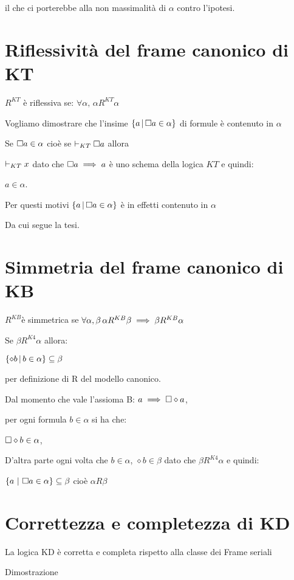 il che ci porterebbe alla non massimalità di $\alpha$ contro l'ipotesi.
\lightning


\section{Riflessività del frame canonico di KT}

$R^{KT}$ è riflessiva se: $\forall\alpha,\,\alpha R^{KT}\alpha$

Vogliamo dimostrare che l'insime $\{a\,|\,\square a\in\alpha\}$ di formule
è contenuto in $\alpha$

Se $\square a\in\alpha$ cioè se $\vdash_{KT}\square a$ allora

$\vdash_{KT}x$ dato che $\square a\implies a$ è uno schema della
logica $KT$ e quindi:

$a\in\alpha$.

Per questi motivi $\{a\,|\,\square a\in\alpha\}$ è in effetti contenuto
in $\alpha$

Da cui segue la tesi.


\section{Simmetria del frame canonico di KB}

$R^{KB}$è simmetrica se $\forall\alpha,\beta\,\alpha R^{KB}\beta\implies\beta R^{KB}\alpha$

Se $\beta R^{K4}\alpha$ allora:

$\{\diamond b\,|\, b\in\alpha\}\subseteq\beta$

per definizione di R del modello canonico.

Dal momento che vale l'assioma B: $a\implies\square\diamond a$,

per ogni formula $b\in\alpha$ si ha che:

$\square\diamond b\in\alpha$,

D'altra parte ogni volta che $b\in\alpha$, $\diamond b\in\beta$
dato che $\beta R^{K4}\alpha$ e quindi:

$\{a\ |\ \square a\in\alpha\}\subseteq\beta$ cioè $\alpha R\beta$


\section{Correttezza e completezza di KD}

La logica KD è corretta e completa rispetto alla classe dei Frame
seriali

Dimostrazione

